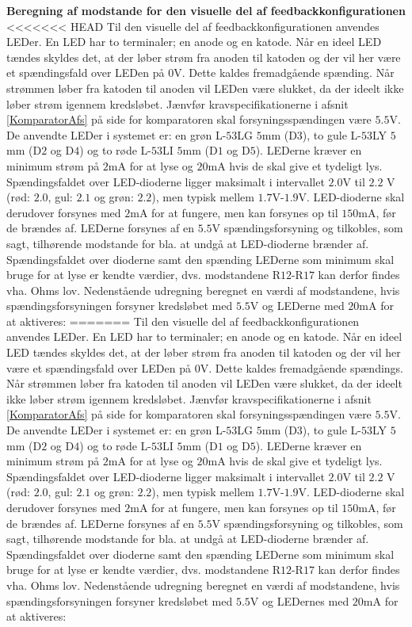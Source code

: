 \noindent\textbf{Beregning af modstande for den visuelle del af feedbackkonfigurationen} \\
<<<<<<< HEAD
Til den visuelle del af feedbackkonfigurationen anvendes LEDer. En LED har to terminaler; en anode og en katode. Når en ideel LED tændes skyldes det, at der løber strøm fra anoden til katoden og der vil her være et spændingsfald over LEDen på 0V. Dette kaldes fremadgående spænding. Når strømmen løber fra katoden til anoden vil LEDen være slukket, da der ideelt ikke løber strøm igennem kredsløbet.\cite{Sedra2010} Jænvfør kravspecifikationerne i afsnit \ref{KomparatorAfs} på side \pageref{KomparatorAfs} for komparatoren skal forsyningsspændingen være $5.5$V. De anvendte LEDer i systemet er: en grøn L-$53$LG $5$mm (D$3$), to gule L-$53$LY $5$mm (D$2$ og D$4$) og to røde L-$53$LI $5$mm (D$1$ og D$5$). LEDerne kræver en minimum strøm på $2$mA for at lyse og $20$mA hvis de skal give et tydeligt lys.  Spændingsfaldet over LED-dioderne ligger maksimalt i intervallet $2.0$V til $2.2$ V (rød: $2.0$, gul: $2.1$ og grøn: $2.2$), men typisk mellem $1.7$V-$1.9$V. LED-dioderne skal derudover forsynes med $2$mA for at fungere, men kan forsynes op til $150$mA, før de brændes af. LEDerne forsynes af en $5.5$V spændingsforsyning og tilkobles, som sagt, tilhørende modstande for bla. at undgå at LED-dioderne brænder af. \cite{kingbright} Spændingsfaldet over dioderne samt den spænding LEDerne som minimum skal bruge for at lyse er kendte værdier, dvs. modstandene R$12$-R$17$ kan derfor findes vha. Ohms lov. Nedenstående udregning beregnet en værdi af modstandene, hvis spændingsforsyningen forsyner kredsløbet med $5.5$V og LEDerne med $20$mA for at aktiveres:
=======
Til den visuelle del af feedbackkonfigurationen anvendes LEDer. En LED har to terminaler; en anode og en katode. Når en ideel LED tændes skyldes det, at der løber strøm fra anoden til katoden og der vil her være et spændingsfald over LEDen på 0V. Dette kaldes fremadgående spændings. Når strømmen løber fra katoden til anoden vil LEDen være slukket, da der ideelt ikke løber strøm igennem kredsløbet. 
Jænvfør kravspecifikationerne i afsnit \ref{KomparatorAfs} på side \pageref{KomparatorAfs} for komparatoren skal forsyningsspændingen være $5.5$V. De anvendte LEDer i systemet er: en grøn L-$53$LG $5$mm (D$3$), to gule L-$53$LY $5$mm (D$2$ og D$4$) og to røde L-$53$LI $5$mm (D$1$ og D$5$). LEDerne kræver en minimum strøm på $2$mA for at lyse og $20$mA hvis de skal give et tydeligt lys.  Spændingsfaldet over LED-dioderne ligger maksimalt i intervallet $2.0$V til $2.2$ V (rød: $2.0$, gul: $2.1$ og grøn: $2.2$), men typisk mellem $1.7$V-$1.9$V. LED-dioderne skal derudover forsynes med $2$mA for at fungere, men kan forsynes op til $150$mA, før de brændes af. LEDerne forsynes af en $5.5$V spændingsforsyning og tilkobles, som sagt, tilhørende modstande for bla. at undgå at LED-dioderne brænder af. \cite{kingbright} Spændingsfaldet over dioderne samt den spænding LEDerne som minimum skal bruge for at lyse er kendte værdier, dvs. modstandene R$12$-R$17$ kan derfor findes vha. Ohms lov. Nedenstående udregning beregnet en værdi af modstandene, hvis spændingsforsyningen forsyner kredsløbet med $5.5$V og LEDernes med $20$mA for at aktiveres:
